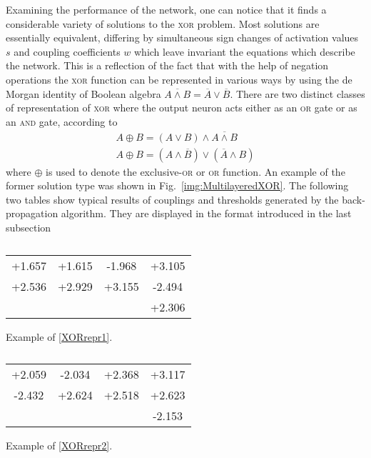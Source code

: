 Examining the performance of the network, one can notice that it finds a considerable variety of solutions to the \textsc{xor} problem. Most solutions are essentially equivalent, differing by simultaneous sign changes of activation values $s$ and coupling coefficients $w$ which leave invariant the equations which describe the network. This is a reflection of the fact that with the help of negation operations the \textsc{xor} function can be represented in various ways by using the de Morgan identity of Boolean algebra $\overline{A\land B}=\overline{A}\lor\overline{B}$. There are two distinct classes of representation of \textsc{xor} where the output neuron acts either as an \textsc{or} gate or as an \textsc{and} gate, according to
\begin{gather}
A\oplus B=(A\lor B)\land\overline{A\land B}\label{XORrepr1}\\
A\oplus B=(A\land\overline{B})\lor(\overline{A}\land B)\label{XORrepr2}
\end{gather}
where $\oplus$ is used to denote the exclusive-\textsc{or} or \textsc{or} function. An example of the former solution type was shown in Fig.~\ref{img:MultilayeredXOR}. The following two tables show typical results of couplings and thresholds generated by the back-propagation algorithm. They are displayed in the format introduced in the last subsection
\begin{table}[h!t]
\centering
{}%
\renewcommand{\arraystretch}{1.15}
\begin{subtable}[ht]{0.495\textwidth}
	\centering
	\begin{tabular}{CC|C|C}
	\hline
	+1.657 & +1.615 & -1.968 & +3.105 \\
	+2.536 & +2.929 & +3.155 & -2.494 \\
	\hline
	 & +2.306 \\
	\end{tabular}
	\caption{Example of \eqref{XORrepr1}.}\label{PERBOOL:tab2.1}
\end{subtable}
\begin{subtable}[ht]{0.495\textwidth}
	\centering
	\begin{tabular}{CC|C|C}
	\hline
	+2.059 & -2.034 & +2.368 & +3.117 \\
	-2.432 & +2.624 & +2.518 & +2.623 \\
	\hline
	 & -2.153 \\
	\end{tabular}
	\caption{Example of \eqref{XORrepr2}.}\label{PERBOOL:tab2.2}
\end{subtable}
\caption{}\label{PERBOOL:tab2}
\end{table}

